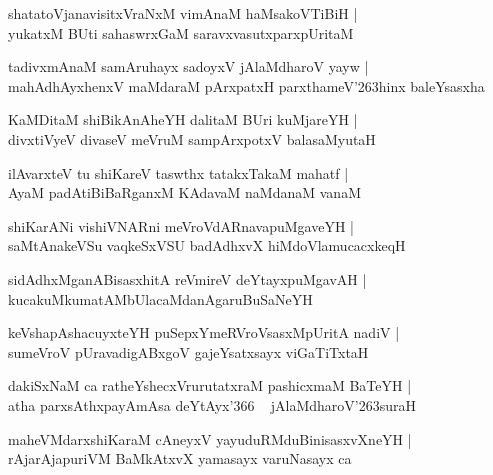 \documentclass[twoside,12pt,openright]{book}
\def\S{\char'263}
\newcounter{shloka}[chapter]
\begin{document}
\begin{shloka}%
shatatoVjanavisitxVraNxM vimAnaM haMsakoVTiBiH |\\
yukatxM BUti sahaswrxGaM saravxvasutxparxpUritaM
\end{shloka}

\begin{shloka}%
tadivxmAnaM samAruhayx sadoyxV jAlaMdharoV yayw |\\
mahAdhAyxhenxV maMdaraM pArxpatxH parxthameV\S hinx baleYsasxha 
\end{shloka}

\begin{shloka}%
KaMDitaM shiBikAnAheYH dalitaM BUri kuMjareYH |\\
divxtiVyeV divaseV meVruM sampArxpotxV balasaMyutaH 
\end{shloka}

\begin{shloka}%
ilAvarxteV tu shiKareV taswthx tatakxTakaM mahatf |\\
AyaM padAtiBiBaRganxM KAdavaM  naMdanaM vanaM 
\end{shloka}

\begin{shloka}%
shiKarANi vishiVNARni meVroVdARnavapuMgaveYH |\\
saMtAnakeVSu vaqkeSxVSU badAdhxvX hiMdoVlamucacxkeqH
\end{shloka}

\begin{shloka}%
sidAdhxMganABisasxhitA reVmireV deYtayxpuMgavAH |\\
kucakuMkumatAMbUlacaMdanAgaruBuSaNeYH
\end{shloka}

\begin{shloka}%
keVshapAshacuyxteYH puSepxYmeRVroVsasxMpUritA nadiV |\\
sumeVroV pUravadigABxgoV gajeYsatxsayx viGaTiTxtaH 
\end{shloka}

\begin{shloka}%
dakiSxNaM ca ratheYshecxVrurutatxraM pashicxmaM BaTeYH |\\
atha parxsAthxpayAmAsa deYtAyx\char'366 ~ jAlaMdharoV\S suraH 
\end{shloka}

\begin{shloka}%
maheVMdarxshiKaraM cAneyxV yayuduRMduBinisasxvXneYH |\\
rAjarAjapuriVM BaMkAtxvX yamasayx varuNasayx ca 
\end{shloka}
\end{document}
